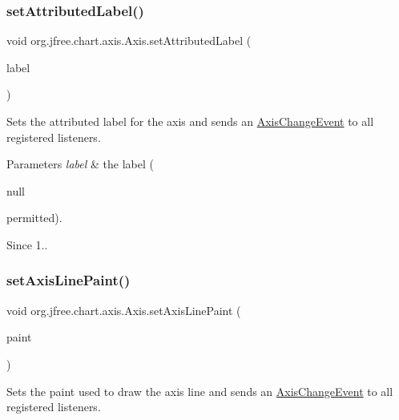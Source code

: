 \subsubsection{\texorpdfstring{set\+Attributed\+Label()}{setAttributedLabel()}\hspace{0.1cm}{\footnotesize\ttfamily [2/2]}}
{\footnotesize\ttfamily void org.\+jfree.\+chart.\+axis.\+Axis.\+set\+Attributed\+Label (\begin{DoxyParamCaption}\item[{Attributed\+String}]{label }\end{DoxyParamCaption})}

Sets the attributed label for the axis and sends an \mbox{\hyperlink{}{Axis\+Change\+Event}} to all registered listeners.


\begin{DoxyParams}{Parameters}
{\em label} & the label (
\begin{DoxyCode}
null 
\end{DoxyCode}
 permitted).\\
\hline
\end{DoxyParams}
\begin{DoxySince}{Since}
1.. 
\end{DoxySince}
\mbox{\label{classorg_1_1jfree_1_1chart_1_1axis_1_1_axis_a8b7c2af897382eca7088d489f60db36d}} 
\subsubsection{\texorpdfstring{set\+Axis\+Line\+Paint()}{setAxisLinePaint()}}
{\footnotesize\ttfamily void org.\+jfree.\+chart.\+axis.\+Axis.\+set\+Axis\+Line\+Paint (\begin{DoxyParamCaption}\item[{Paint}]{paint }\end{DoxyParamCaption})}

Sets the paint used to draw the axis line and sends an \mbox{\hyperlink{}{Axis\+Change\+Event}} to all registered listeners.


